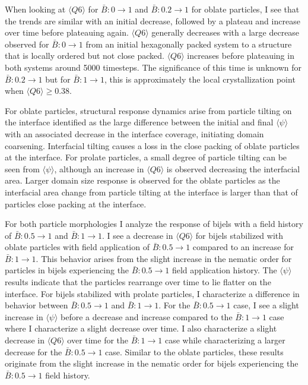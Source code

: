 When looking at $\langle Q6 \rangle$ for $\bar{B}: 0 \rightarrow 1$
and $\bar{B}: 0.2 \rightarrow 1$ for oblate particles, I see that the
trends are similar with an initial decrease, followed by a plateau and
increase over time before plateauing again. $\langle Q6 \rangle$
generally decreases with a large decrease observed for
\(\bar{B}: 0 \rightarrow 1\) from an initial hexagonally packed system
to a structure that is locally ordered but not close packed. $\langle Q6 \rangle$ increases before plateauing 
in both systems around 5000 timesteps. The significance of
this time is unknown for $\bar{B}: 0.2 \rightarrow 1$ but for
$\bar{B}: 1 \rightarrow 1$, this is approximately the local
crystallization point when $\langle Q6 \rangle \geq 0.38$.

For oblate particles, structural response dynamics
arise from particle tilting on the interface identified as the large
difference between the initial and final $\langle \psi \rangle$ with
an associated decrease in the interface coverage, initiating domain
coarsening. Interfacial tilting causes a loss in the
close packing of oblate particles at the interface. For prolate
particles, a small degree of particle tilting can be seen
from $\langle \psi \rangle$, although an increase in $\langle Q6 \rangle$ is observed
decreasing the interfacial area. Larger domain size response is
observed for the oblate particles as the interfacial area change from
particle tilting at the interface is larger than that of particles close
packing at the interface.

For both particle morphologies I analyze the response of bijels with a
field history of $\bar{B}: 0.5 \rightarrow 1$ and
$\bar{B}: 1 \rightarrow 1$. I see a decrease in
$\langle Q6 \rangle$ for bijels stabilized with oblate particles with
field application of $\bar{B}: 0.5 \rightarrow 1$ compared to an
increase for $\bar{B}: 1 \rightarrow 1$. This behavior arises from the
slight increase in the nematic order for particles in bijels
experiencing the $\bar{B}: 0.5 \rightarrow 1$ field application
history. The $\langle \psi \rangle$ results indicate that the
particles rearrange over time to lie flatter on the interface. For
bijels stabilized with prolate particles, I characterize a difference
in behavior between $\bar{B}: 0.5 \rightarrow 1$ and
$\bar{B}: 1 \rightarrow 1$. For the $\bar{B}: 0.5 \rightarrow 1$
case, I see a slight increase in $\langle \psi \rangle$ before a
decrease and increase compared to the $\bar{B}: 1 \rightarrow 1$ case
where I characterize a slight decrease over time. I also characterize
a slight decrease in $\langle Q6 \rangle$ over time for the
$\bar{B}: 1 \rightarrow 1$ case while characterizing a larger decrease
for the $\bar{B}: 0.5 \rightarrow 1$ case. Similar to the oblate
particles, these results originate from the slight increase in the
nematic order for bijels experiencing the $\bar{B}: 0.5 \rightarrow 1$
field history.

